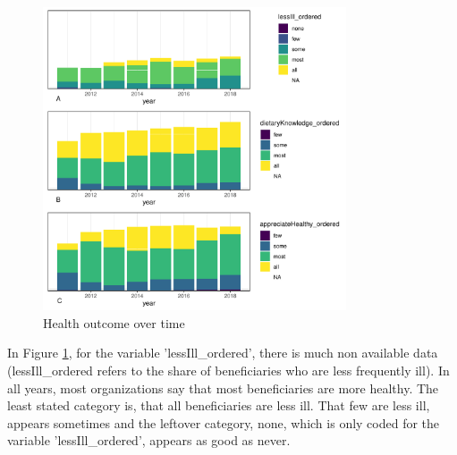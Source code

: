 \documentclass[12pt, a4paper, titlepage]{article}\usepackage[]{graphicx}\usepackage[]{color}
\newenvironment{knitrout}{}{} %
\begin{document}
\begin{figure}
  \caption{Health outcome over time}
  \label{Health_timeplots}
\begin{knitrout}
\color{fgcolor}

{\centering \includegraphics[width=0.8\textwidth]{figure/HealthTimePlots-1} 

}



\end{knitrout}
\end{figure}

In Figure \ref{Health_timeplots}, for the variable 'lessIll_ordered', there is much non available data (lessIll_ordered refers to the share of beneficiaries who are less frequently ill). In all years, most organizations say that most beneficiaries are more healthy. The least stated category is, that all beneficiaries are less ill. That few are less ill, appears sometimes and the leftover category, none, which is only coded for the variable 'lessIll_ordered', appears as good as never.
\end{document}
